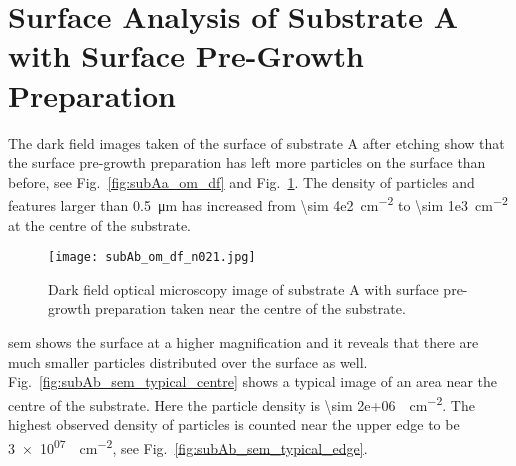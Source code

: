 \clearpage
%
%
\section[Surface Analysis of Substrate A with Surface Pre-Growth Preparation]{Surface Analysis of Substrate A with Surface Pre-Growth Preparation%
    }\label{sec:subAb}

The dark field images taken of the surface of substrate A after etching show that the surface pre-growth preparation has left more particles on the surface than before, see Fig.~\ref{fig:subAa_om_df} and Fig.~\ref{fig:subAb_om_df}. The density of particles and features larger than \SI{0.5}{\micro\metre} has increased from \SI{\sim 4e2}{\centi\metre^{-2}} to \SI{\sim 1e3}{\centi\metre^{-2}} at the centre of the substrate. 

\begin{figure}[htbp]
    \centering
    \texttt{[image: subAb\_om\_df\_n021.jpg]}
    \caption[Dark field optical microscopy image of substrate A with surface pre-growth preparation.]{Dark field optical microscopy image of substrate A with surface pre-growth preparation taken near the centre of the substrate.}\label{fig:subAb_om_df}
\end{figure}

\Ac{sem} shows the surface at a higher magnification and it reveals that there are much smaller particles distributed over the surface as well. Fig.~\ref{fig:subAb_sem_typical_centre} shows a typical image of an area near the centre of the substrate. Here the particle density is  \SI{\sim 2e+06}{\particle\centi\metre^{-2}}. The highest observed density of particles is counted near the upper edge to be \SI{3e+07}{\particle\centi\metre^{-2}}, see Fig.~\ref{fig:subAb_sem_typical_edge}.

